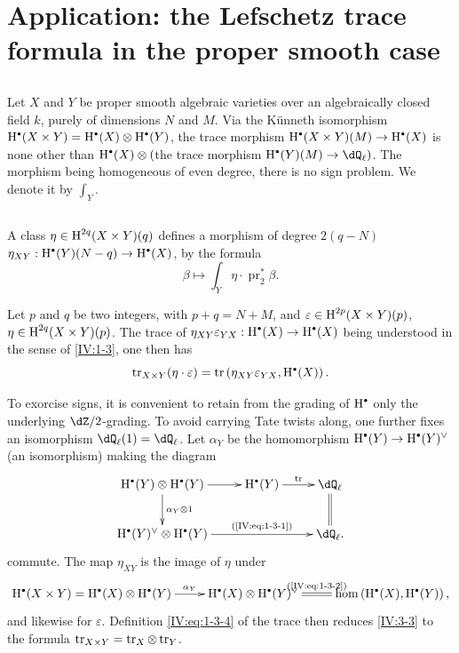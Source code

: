 \section{Application: the Lefschetz trace formula in the proper smooth case}\label{IV:3}




\subsection{}\label{IV:3-1}

Let $X$ and $Y$ be proper smooth algebraic varieties over an algebraically
closed field $k$, purely of dimensions $N$ and $M$. Via
the K\"unneth isomorphism
$\h^\bullet(X\times Y)=\h^\bullet(X)\otimes \h^\bullet(Y)$, the trace
morphism $\h^\bullet(X\times Y)(M)\to \h^\bullet(X)$ is none other than
$\h^\bullet(X)\otimes ($the trace morphism $\h^\bullet(Y)(M)\to \dQ_\ell)$. The
morphism being homogeneous of even degree, there is no sign
problem. We denote it by $\int_Y$.




\subsection{}\label{IV:3-2}

A class $\eta\in \operatorname{H}^{2 q}(X\times Y)(q)$ defines a morphism of degree
$2(q-N)$ $\eta_{XY}:\h^\bullet(Y)(N-q)\to \h^\bullet(X)$, by the formula
\[
  \beta \mapsto \int_Y \eta\cdot \operatorname{pr}_2^\ast \beta \text{.}
\]




\begin{proposition_}\label{IV:3-3}
Let $p$ and $q$ be two integers, with $p+q=N+M$, and
$\varepsilon\in \operatorname{H}^{2 p}(X\times Y)(p)$, $\eta\in \operatorname{H}^{2 q}(X\times Y)(p)$. The
trace of $\eta_{X Y}\varepsilon_{Y X}:\h^\bullet(X)\to \h^\bullet(X)$ being
understood in the sense of \ref{IV:1-3}, one then has
\[
  \tr_{X\times Y}(\eta\cdot \varepsilon) = \tr\left(\eta_{X Y}\varepsilon_{Y X},\h^\bullet(X)\right) \text{.}
\]
\end{proposition_}

To exorcise signs, it is convenient to retain from the grading
of $\h^\bullet$ only the underlying $\dZ/2$-grading. To avoid carrying
Tate twists along, one further fixes an isomorphism
$\dQ_\ell(1)=\dQ_\ell$. Let $\alpha_Y$ be the homomorphism
$\h^\bullet(Y)\to \h^\bullet(Y)^\vee$ (an isomorphism) making the diagram
\[\xymatrix{
  \h^\bullet(Y)\otimes \h^\bullet(Y) \ar[r] \ar[d]^-{\alpha_Y\otimes 1}
    & \h^\bullet(Y) \ar[r]^-{\tr}
    & \dQ_\ell \ar@{=}[d] \\
  \h^\bullet(Y)^\vee \otimes \h^\bullet(Y) \ar[rr]^-{\text{(\ref{IV:eq:1-3-1})}}
    & & \dQ_\ell \text{.}
}\]
commute. The map $\eta_{X Y}$ is the image of $\eta$ under
\[\xymatrix{
  \h^\bullet(X\times Y) = \h^\bullet(X)\otimes \h^\bullet(Y) \ar[r]^-{\alpha_Y}
    & \h^\bullet(X) \otimes \h^\bullet(Y)^\vee \ar@{=}[r]^-{\text{(\ref{IV:eq:1-3-2})}}
    & \hom\left(\h^\bullet(X),\h^\bullet(Y)\right) \text{,}
}\]
and likewise for $\varepsilon$. Definition \ref{IV:eq:1-3-4} of the trace
then reduces \ref{IV:3-3} to the formula
$\operatorname{tr}_{X\times Y}=\operatorname{tr}_X\otimes \operatorname{tr}_Y$.




